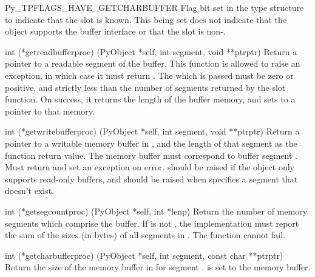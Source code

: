 \begin{datadesc}{Py_TPFLAGS_HAVE_GETCHARBUFFER}
  Flag bit set in the type structure to indicate that the
   slot is known.  This being set does not
  indicate that the object supports the buffer interface or that the
   slot is non-\NULL.
\end{datadesc}

\begin{ctypedesc}[getreadbufferproc]{int (*getreadbufferproc)
                            (PyObject *self, int segment, void **ptrptr)}
  Return a pointer to a readable segment of the buffer.  This function
  is allowed to raise an exception, in which case it must return
  .  The  which is passed must be zero or
  positive, and strictly less than the number of segments returned by
  the  slot function.  On success, it returns
  the length of the buffer memory, and sets  to a
  pointer to that memory.
\end{ctypedesc}

\begin{ctypedesc}[getwritebufferproc]{int (*getwritebufferproc)
                            (PyObject *self, int segment, void **ptrptr)}
  Return a pointer to a writable memory buffer in
  , and the length of that segment as the function
  return value.  The memory buffer must correspond to buffer segment
  .  Must return  and set an exception on
  error.   should be raised if the object only
  supports read-only buffers, and  should be
  raised when  specifies a segment that doesn't exist.
\end{ctypedesc}

\begin{ctypedesc}[getsegcountproc]{int (*getsegcountproc)
                            (PyObject *self, int *lenp)}
  Return the number of memory segments which comprise the buffer.  If
   is not \NULL, the implementation must report the sum of
  the sizes (in bytes) of all segments in .
  The function cannot fail.
\end{ctypedesc}

\begin{ctypedesc}[getcharbufferproc]{int (*getcharbufferproc)
                            (PyObject *self, int segment, const char **ptrptr)}
  Return the size of the memory buffer in  for segment
  .   is set to the memory buffer.
\end{ctypedesc}


